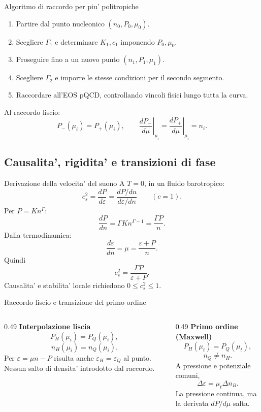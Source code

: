 \begin{frame}{Algoritmo di raccordo per piu' politropiche}
\small
\begin{enumerate}
\item Partire dal punto nucleonico $(n_0,P_0,\mu_0)$.
\item Scegliere $\Gamma_1$ e determinare $K_1,c_1$ imponendo $P_0,\mu_0$.
\item Proseguire fino a un nuovo punto $(n_1,P_1,\mu_1)$.
\item Scegliere $\Gamma_2$ e imporre le stesse condizioni per il secondo segmento.
\item Raccordare all'EOS pQCD, controllando vincoli fisici lungo tutta la curva.
\end{enumerate}
\medskip
Al raccordo liscio:
\[
P_-(\mu_i)=P_+(\mu_i),\qquad
\left.\frac{dP_-}{d\mu}\right|_{\mu_i}
=\left.\frac{dP_+}{d\mu}\right|_{\mu_i}=n_i.
\]
\end{frame}

\subsection{Causalita', rigidita' e transizioni di fase}

\begin{frame}{Derivazione della velocita' del suono}
\small
A $T=0$, in un fluido barotropico:
\[
c_s^2=\frac{dP}{d\varepsilon}
=\frac{dP/dn}{d\varepsilon/dn}
\qquad(c=1).
\]
Per $P=Kn^\Gamma$:
\[
\frac{dP}{dn}=\Gamma Kn^{\Gamma-1}=\frac{\Gamma P}{n}.
\]
Dalla termodinamica:
\[
\frac{d\varepsilon}{dn}=\mu=\frac{\varepsilon+P}{n}.
\]
Quindi
\[
{c_s^2=\frac{\Gamma P}{\varepsilon+P}.}
\]
Causalita' e stabilita' locale richiedono $0\leq c_s^2\leq1$.
\end{frame}

\begin{frame}{Raccordo liscio e transizione del primo ordine}
\small
\begin{columns}[T,onlytextwidth]
\begin{column}{0.49\textwidth}
\textbf{Interpolazione liscia}
\[
P_H(\mu_i)=P_Q(\mu_i),
\]
\[
n_H(\mu_i)=n_Q(\mu_i).
\]
Per $\varepsilon=\mu n-P$ risulta anche $\varepsilon_H=\varepsilon_Q$ al punto.
\medskip
Nessun salto di densita' introdotto dal raccordo.
\end{column}
\begin{column}{0.49\textwidth}
\textbf{Primo ordine (Maxwell)}
\[
P_H(\mu_t)=P_Q(\mu_t),
\]
\[
n_Q\ne n_H.
\]
A pressione e potenziale comuni,
\[
{\Delta\varepsilon=\mu_t\Delta n_B.}
\]
La pressione continua, ma la derivata $dP/d\mu$ salta.
\end{column}
\end{columns}
\end{frame}

